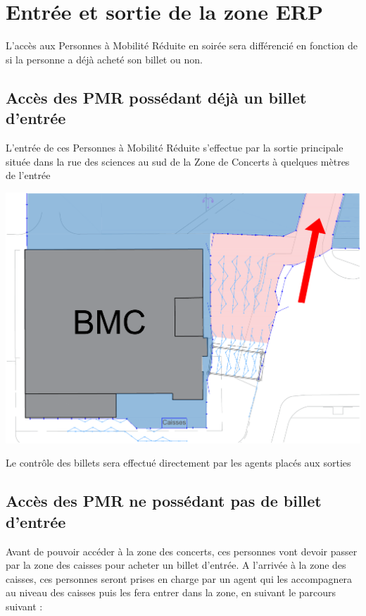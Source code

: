 \documentclass[hidelinks, paper=a4, fontsize=13pt]{report}
\begin{document}
\section{Entrée et sortie de la zone ERP}
L’accès aux Personnes à Mobilité Réduite en soirée sera différencié en fonction de si la personne a déjà acheté son billet ou non.

\subsection{Accès des PMR possédant déjà un billet d’entrée}


L’entrée de ces Personnes à Mobilité Réduite s’effectue par la sortie principale située dans la rue des sciences au sud de la Zone de Concerts à quelques mètres de l’entrée


\begin{center}
\includegraphics[width=.8\textwidth,keepaspectratio]{Exports/Plan_24h_45eme-Acces_PMR_ac_Billet}
\end{center}


Le contrôle des billets sera effectué directement par les agents placés aux sorties


\subsection{Accès des PMR ne possédant pas de billet d’entrée}

Avant de pouvoir accéder à la zone des concerts, ces personnes vont devoir passer par la zone des caisses pour acheter un billet d’entrée. A l’arrivée à la zone des caisses, ces personnes seront prises en charge par un agent qui les accompagnera au niveau des caisses puis les fera entrer dans la zone, en suivant le parcours suivant :
\end{document}
